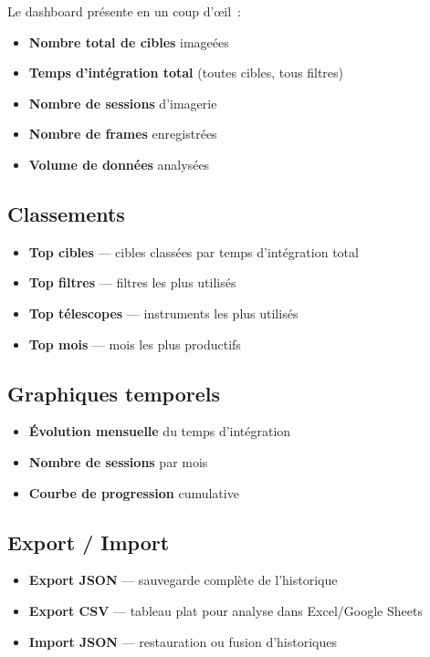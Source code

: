 \documentclass[a4paper,11pt]{article}
\begin{document}
Le dashboard pr\'{e}sente en un coup d'\oe{}il~:

\begin{itemize}
    \item \textbf{Nombre total de cibles} image\'{e}es
    \item \textbf{Temps d'int\'{e}gration total} (toutes cibles, tous filtres)
    \item \textbf{Nombre de sessions} d'imagerie
    \item \textbf{Nombre de frames} enregistr\'{e}es
    \item \textbf{Volume de donn\'{e}es} analys\'{e}es
\end{itemize}

\subsection{Classements}

\begin{itemize}
    \item \textbf{Top cibles} --- cibles class\'{e}es par temps d'int\'{e}gration total
    \item \textbf{Top filtres} --- filtres les plus utilis\'{e}s
    \item \textbf{Top t\'{e}lescopes} --- instruments les plus utilis\'{e}s
    \item \textbf{Top mois} --- mois les plus productifs
\end{itemize}

\subsection{Graphiques temporels}

\begin{itemize}
    \item \textbf{\'{E}volution mensuelle} du temps d'int\'{e}gration
    \item \textbf{Nombre de sessions} par mois
    \item \textbf{Courbe de progression} cumulative
\end{itemize}

\subsection{Export / Import}

\begin{itemize}
    \item \textbf{Export JSON} --- sauvegarde compl\`{e}te de l'historique
    \item \textbf{Export CSV} --- tableau plat pour analyse dans Excel/Google Sheets
    \item \textbf{Import JSON} --- restauration ou fusion d'historiques
\end{itemize}
\end{document}
